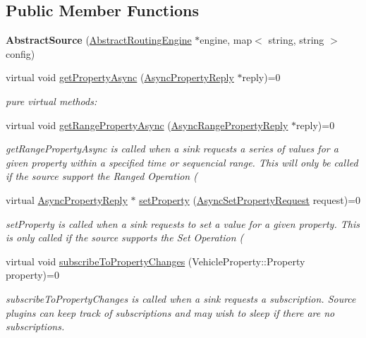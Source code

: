 \subsection*{Public Member Functions}
\begin{DoxyCompactItemize}
\item 
\hypertarget{classAbstractSource_a753c78f3ee4c565c4ba2157c06cb7fbe}{{\bfseries Abstract\+Source} (\hyperlink{classAbstractRoutingEngine}{Abstract\+Routing\+Engine} $\ast$engine, map$<$ string, string $>$ config)}\label{classAbstractSource_a753c78f3ee4c565c4ba2157c06cb7fbe}

\item 
virtual void \hyperlink{classAbstractSource_a05589e699ea16a14675db226d51bdf9f}{get\+Property\+Async} (\hyperlink{classAsyncPropertyReply}{Async\+Property\+Reply} $\ast$reply)=0
\begin{DoxyCompactList}\small\item\em pure virtual methods\+: \end{DoxyCompactList}\item 
virtual void \hyperlink{classAbstractSource_a3b30f939d68889b2540f6035fa5be7c7}{get\+Range\+Property\+Async} (\hyperlink{classAsyncRangePropertyReply}{Async\+Range\+Property\+Reply} $\ast$reply)=0
\begin{DoxyCompactList}\small\item\em get\+Range\+Property\+Async is called when a sink requests a series of values for a given property within a specified time or sequencial range. This will only be called if the source support the Ranged Operation ( \end{DoxyCompactList}\item 
virtual \hyperlink{classAsyncPropertyReply}{Async\+Property\+Reply} $\ast$ \hyperlink{classAbstractSource_a684b58112b5572dfe8cb94380bf7d74a}{set\+Property} (\hyperlink{classAsyncSetPropertyRequest}{Async\+Set\+Property\+Request} request)=0
\begin{DoxyCompactList}\small\item\em set\+Property is called when a sink requests to set a value for a given property. This is only called if the source supports the Set Operation ( \end{DoxyCompactList}\item 
virtual void \hyperlink{classAbstractSource_ae9c042e159f080c298b2ae37c47618e9}{subscribe\+To\+Property\+Changes} (Vehicle\+Property\+::\+Property property)=0
\begin{DoxyCompactList}\small\item\em subscribe\+To\+Property\+Changes is called when a sink requests a subscription. Source plugins can keep track of subscriptions and may wish to sleep if there are no subscriptions. \end{DoxyCompactList}\item 

\end{DoxyCompactItemize}
